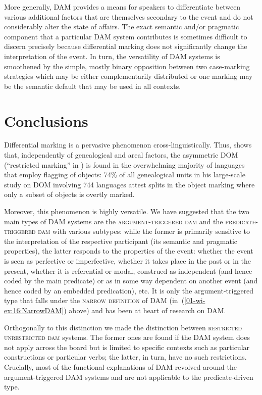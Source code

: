 \documentclass[output=paper]{LSP/langsci}
\begin{document}
More generally, DAM provides a means for speakers to differentiate between various additional factors that are themselves secondary to the event and do not considerably alter the state of affairs. 
The exact semantic and/or pragmatic component that a particular DAM system contributes is sometimes difficult to discern precisely because differential marking does not significantly change the interpretation of the event. 
In turn, the versatility of DAM systems is smoothened by the simple, mostly binary opposition between two case-marking strategies which may be either complementarily distributed or one marking may be the semantic default that may be used in all contexts.

\section{Conclusions}
\label{01-wi-sec:5-Conclusions}

Differential marking is a pervasive phenomenon cross-linguistically. 
Thus, \citet[297]{Sinnemki2014Typological} shows that, independently of genealogical and areal factors, the asymmetric DOM (“restricted marking” in \citealt{Sinnemki2014Typological}) is found in the overwhelming majority of languages that employ flagging of objects: 74\% of all genealogical units in his large-scale study on DOM involving 744 languages attest splits in the object marking where only a subset of objects is overtly marked. 

Moreover, this phenomenon is highly versatile. 
We have suggested that the two main types of DAM systems are the \textsc{argument-triggered dam} and the \textsc{predicate-triggered dam} with various subtypes: while the former is primarily sensitive to the interpretation of the respective participant (its semantic and pragmatic properties), the latter responds to the properties of the event: \eg whether the event is seen as perfective or imperfective, whether it takes place in the past or in the present, whether it is referential or modal, construed as independent (and hence coded by the main predicate) or as in some way dependent on another event (and hence coded by an embedded predication), etc. 
It is only the argument-triggered type that falls under the \textsc{narrow definition} of DAM (in~(\ref{01-wi-ex:16:NarrowDAM}) above) and has been at heart of research on DAM.

Orthogonally to this distinction we made the distinction between \textsc{restricted} \vs \textsc{unrestricted dam} systems. 
The former ones are found if the DAM system does not apply across the board but is limited to specific contexts such as particular constructions or particular verbs; the latter, in turn, have no such restrictions. 
Crucially, most of the functional explanations of DAM revolved around the argument-triggered DAM systems and are not applicable to the predicate-driven type.
\end{document}
